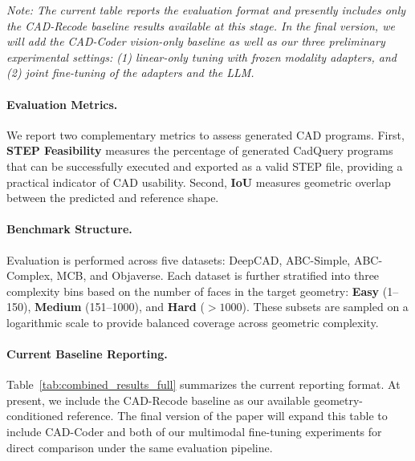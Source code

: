 \documentclass{article}
\begin{document}
\textit{Note: The current table reports the evaluation format and presently includes only the CAD-Recode baseline results available at this stage. In the final version, we will add the CAD-Coder vision-only baseline as well as our three preliminary experimental settings: (1) linear-only tuning with frozen modality adapters, and (2) joint fine-tuning of the adapters and the LLM.}

\paragraph{Evaluation Metrics.}
We report two complementary metrics to assess generated CAD programs. First, \textbf{STEP Feasibility} measures the percentage of generated CadQuery programs that can be successfully executed and exported as a valid STEP file, providing a practical indicator of CAD usability. Second, \textbf{IoU} measures geometric overlap between the predicted and reference shape.

\paragraph{Benchmark Structure.}
Evaluation is performed across five datasets: DeepCAD, ABC-Simple, ABC-Complex, MCB, and Objaverse. Each dataset is further stratified into three complexity bins based on the number of faces in the target geometry: \textbf{Easy} (1--150), \textbf{Medium} (151--1000), and \textbf{Hard} ($>1000$). These subsets are sampled on a logarithmic scale to provide balanced coverage across geometric complexity.

\paragraph{Current Baseline Reporting.}
Table~\ref{tab:combined_results_full} summarizes the current reporting format. At present, we include the CAD-Recode baseline as our available geometry-conditioned reference. The final version of the paper will expand this table to include CAD-Coder and both of our multimodal fine-tuning experiments for direct comparison under the same evaluation pipeline.
\end{document}
